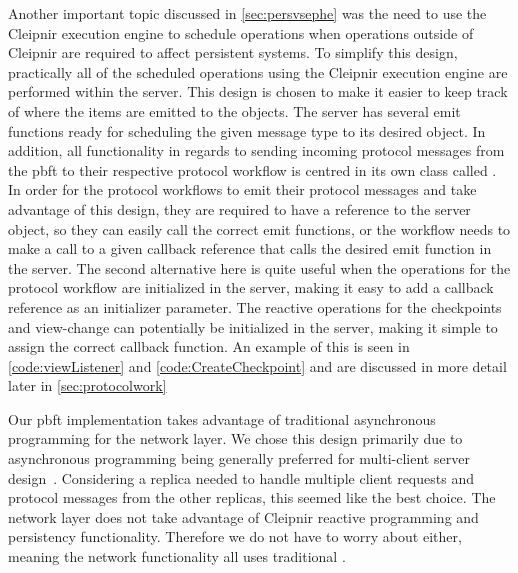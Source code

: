 Another important topic discussed in \autoref{sec:persvsephe} was the need to use the Cleipnir execution engine to schedule operations when operations outside of Cleipnir are required to affect persistent systems. To simplify this design, practically all of the scheduled operations using the Cleipnir execution engine are performed within the server. This design is chosen to make it easier to keep track of where the items are emitted to the  objects. The server has several emit functions ready for scheduling the given message type to its desired  object. In addition, all functionality in regards to sending incoming protocol messages from the \ac{pbft} to their respective protocol workflow is centred in its own class called . In order for the protocol workflows to emit their protocol messages and take advantage of this design, they are required to have a reference to the server object, so they can easily call the correct emit functions, or the workflow needs to make a call to a given callback reference that calls the desired emit function in the server. The second alternative here is quite useful when the operations for the protocol workflow are initialized in the server, making it easy to add a callback reference as an initializer parameter. The reactive operations for the checkpoints and view-change can potentially be initialized in the server, making it simple to assign the correct callback function. An example of this is seen in \autoref{code:viewListener} and \autoref{code:CreateCheckpoint} and are discussed in more detail later in \autoref{sec:protocolwork}

Our \ac{pbft} implementation takes advantage of traditional asynchronous programming for the network layer. We chose this design primarily due to asynchronous programming being generally preferred for multi-client server design~\cite{VIDEO:AsyncConBack, DOC:AsyncAwait}. Considering a replica needed to handle multiple client requests and protocol messages from the other replicas, this seemed like the best choice. The network layer does not take advantage of Cleipnir reactive programming and persistency functionality. Therefore we do not have to worry about  either, meaning the network functionality all uses traditional .

\iffalse
